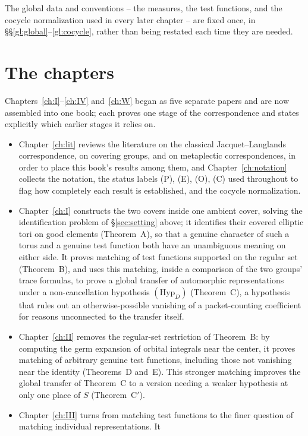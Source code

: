 \documentclass[11pt,oneside]{book}
\theoremstyle{plain}
\theoremstyle{definition}
\begin{document}
The global data and conventions -- the measures, the test functions, and the cocycle normalization used in every later chapter -- are fixed once, in
\S\S\ref{gl:global}--\ref{gl:cocycle}, rather than being restated each time they are needed.

\section{The chapters}\label{sec:chapters}
Chapters~\ref{ch:I}--\ref{ch:IV} and~\ref{ch:W} began as five separate papers and are now assembled into one book; each proves one stage of the correspondence and states explicitly which earlier stages it relies on.
\begin{itemize}[leftmargin=*]
\item Chapter~\ref{ch:lit} reviews the literature on the classical Jacquet--Langlands correspondence, on covering groups, and on metaplectic correspondences, in order to place this book's results among them, and
Chapter~\ref{ch:notation} collects the notation, the status labels (P), (E), (O), (C) used throughout to flag how completely each result is established, and
the cocycle normalization.
\item Chapter~\ref{ch:I} constructs the two covers inside one ambient cover, solving the identification problem of \S\ref{sec:setting} above; it
identifies their covered elliptic tori on good elements (Theorem~A), so that a genuine character of such a torus and a genuine test function both have an unambiguous meaning on either side. It
proves matching of test functions supported on the regular set (Theorem~B), and
uses this matching, inside a comparison of the two groups' trace formulas, to prove a global transfer of automorphic representations under a non-cancellation hypothesis $(\mathrm{Hyp}_D)$ (Theorem~C), a hypothesis that rules out an otherwise-possible vanishing of a packet-counting coefficient for reasons unconnected to the transfer itself.
\item Chapter~\ref{ch:II} removes the regular-set restriction of Theorem~B: by computing the germ expansion of orbital integrals near the center, it proves matching of arbitrary genuine test functions, including those not vanishing near the identity (Theorems~D and~E). This stronger matching improves the global transfer of Theorem~C to a version needing a weaker hypothesis at only one place of $S$ (Theorem~C$'$).
\item Chapter~\ref{ch:III} turns from matching test functions to the finer question of matching individual representations. It

\end{itemize}
\end{document}
